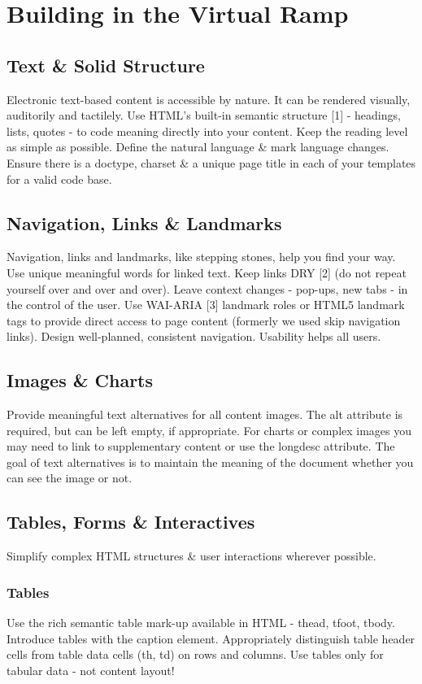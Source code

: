 \documentclass{acm_proc_article-sp}
\begin{document}
\section{Building in the {\secit Virtual} Ramp}

\subsection{Text \& Solid Structure}

Electronic text-based content is accessible by nature. It can be rendered visually, auditorily and tactilely. Use HTML's built-in semantic structure [1] - headings, lists, quotes - to code meaning directly into your content. Keep the reading level as simple as possible. Define the natural language \& mark language changes. Ensure there is a doctype, charset \& a unique page title in each of your templates for a valid code base.

\subsection{Navigation, Links \& Landmarks}
Navigation, links and landmarks, like stepping stones, help you find your way. Use unique meaningful words for linked text. Keep links DRY [2] (do not repeat yourself over and over and over). Leave context changes - pop-ups, new tabs - in the control of the user. Use WAI-ARIA [3] landmark roles or HTML5 landmark tags to provide direct access to page content (formerly we used skip navigation links). Design well-planned, consistent navigation. Usability helps all users.

\subsection{Images \& Charts}
Provide meaningful text alternatives for all content images. The alt attribute is required, but can be left empty, if appropriate. For charts or complex images you may need to link to supplementary content or use the longdesc attribute. The goal of text alternatives is to maintain the meaning of the document whether you can see the image or not.

\subsection{Tables, Forms \& Interactives}
Simplify complex HTML structures \& user interactions wherever possible.
\subsubsection{Tables}
Use the rich semantic table mark-up available in HTML - thead, tfoot, tbody. Introduce tables with the caption element. Appropriately distinguish table header cells from table data cells (th, td) on rows and columns. Use tables only for tabular data - not content layout!
\end{document}
